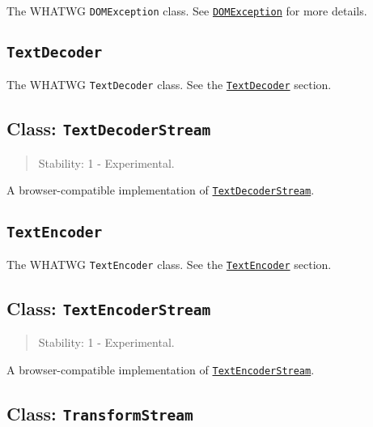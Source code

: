 The WHATWG \texttt{DOMException} class. See
\href{https://developer.mozilla.org/en-US/docs/Web/API/DOMException}{\texttt{DOMException}}
for more details.

\subsection{\texorpdfstring{\texttt{TextDecoder}}{TextDecoder}}\label{textdecoder}

The WHATWG \texttt{TextDecoder} class. See the
\href{util.md\#class-utiltextdecoder}{\texttt{TextDecoder}} section.

\subsection{\texorpdfstring{Class:
\texttt{TextDecoderStream}}{Class: TextDecoderStream}}\label{class-textdecoderstream}

\begin{quote}
Stability: 1 - Experimental.
\end{quote}

A browser-compatible implementation of
\href{webstreams.md\#class-textdecoderstream}{\texttt{TextDecoderStream}}.

\subsection{\texorpdfstring{\texttt{TextEncoder}}{TextEncoder}}\label{textencoder}

The WHATWG \texttt{TextEncoder} class. See the
\href{util.md\#class-utiltextencoder}{\texttt{TextEncoder}} section.

\subsection{\texorpdfstring{Class:
\texttt{TextEncoderStream}}{Class: TextEncoderStream}}\label{class-textencoderstream}

\begin{quote}
Stability: 1 - Experimental.
\end{quote}

A browser-compatible implementation of
\href{webstreams.md\#class-textencoderstream}{\texttt{TextEncoderStream}}.

\subsection{\texorpdfstring{Class:
\texttt{TransformStream}}{Class: TransformStream}}\label{class-transformstream}


